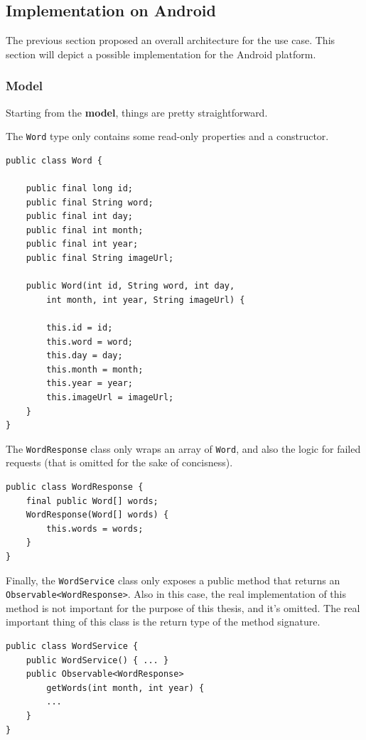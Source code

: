 \subsection{Implementation on Android}\label{implementation-on-android}

The previous section proposed an overall architecture for the use case.
This section will depict a possible implementation for the Android
platform.

\subsubsection{Model}\label{model}

Starting from the \textbf{model}, things are pretty straightforward.

The \texttt{Word} type only contains some read-only properties and a
constructor.

\begin{verbatim}
public class Word {

    public final long id;
    public final String word;
    public final int day;
    public final int month;
    public final int year;
    public final String imageUrl;

    public Word(int id, String word, int day,
        int month, int year, String imageUrl) {

        this.id = id;
        this.word = word;
        this.day = day;
        this.month = month;
        this.year = year;
        this.imageUrl = imageUrl;
    }
}
\end{verbatim}

The \texttt{WordResponse} class only wraps an array of \texttt{Word},
and also the logic for failed requests (that is omitted for the sake of
concisness).

\begin{verbatim}
public class WordResponse {
    final public Word[] words;
    WordResponse(Word[] words) {
        this.words = words;
    }
}
\end{verbatim}

Finally, the \texttt{WordService} class only exposes a public method that
returns an \texttt{Observable\textless{}WordResponse\textgreater{}}.
Also in this case, the real implementation of this method is not
important for the purpose of this thesis, and it's omitted. The real
important thing of this class is the return type of the method
signature.

\begin{verbatim}
public class WordService {
    public WordService() { ... }
    public Observable<WordResponse>
        getWords(int month, int year) {
        ...
    }
}
\end{verbatim}

